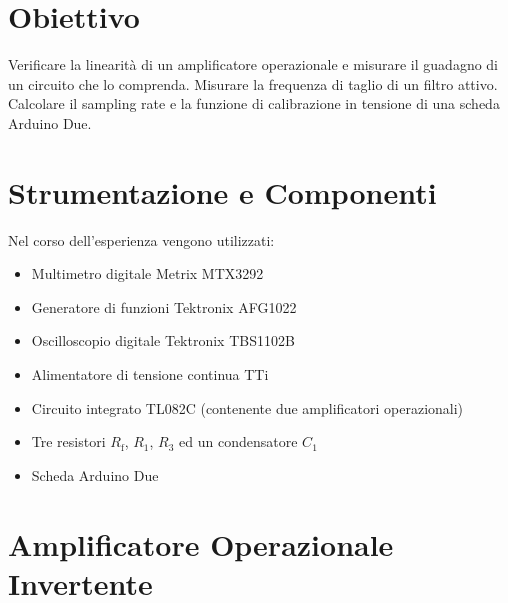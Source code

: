 \documentclass[a4paper,11pt]{article} %
\begin{document}
\section{Obiettivo}

Verificare la linearità di un amplificatore operazionale e misurare il guadagno di un circuito che lo comprenda.
Misurare la frequenza di taglio di un filtro attivo. Calcolare il sampling rate e la funzione di calibrazione in
tensione di una scheda Arduino Due.


\section{Strumentazione e Componenti}\label{s:strumenti}

Nel corso dell'esperienza vengono utilizzati:
\begin{itemize}
	\item Multimetro digitale Metrix MTX3292
	\item Generatore di funzioni Tektronix AFG1022
	\item Oscilloscopio digitale Tektronix TBS1102B
	\item Alimentatore di tensione continua TTi
	\item Circuito integrato TL082C (contenente due amplificatori operazionali)
	\item Tre resistori $R_{\text{f}}$, $R_{1}$, $R_{3}$ ed un condensatore $C_{1}$ 
	\item Scheda Arduino Due
\end{itemize}



\section{Amplificatore Operazionale Invertente}\label{s:opamp} 
\end{document}
